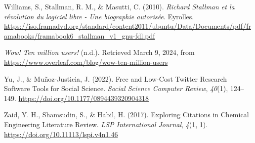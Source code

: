 \documentclass[
  letterpaper,
  DIV=11,
  numbers=noendperiod]{scrreprt}
\newlength{\cslhangindent}
\newlength{\cslentryspacingunit} %
\newenvironment{CSLReferences}[2] %
 {%
  \setlength{\parindent}{0pt}
  \ifodd #1
  \let\oldpar\par
  \def\par{\hangindent=\cslhangindent\oldpar}
  \fi
  \setlength{\parskip}{#2\cslentryspacingunit}
 }%
 {}
\begin{document}
\begin{CSLReferences}{1}{0}
\leavevmode{}%
Williams, S., Stallman, R. M., \& Masutti, C. (2010). \emph{Richard
Stallman et la révolution du logiciel libre - Une biographie autorisée}.
Eyrolles.
\url{https://iso.framadvd.org/standard/content2011/ubuntu/Data/Documents/pdf/framabooks/framabook6_stallman_v1_gnu-fdl.pdf}

\leavevmode{}%
\emph{Wow! {Ten} million users!} (n.d.). Retrieved March 9, 2024, from
\url{https://www.overleaf.com/blog/wow-ten-million-users}

\leavevmode{}%
Yu, J., \& Muñoz-Justicia, J. (2022). Free and {Low-Cost Twitter
Research Software Tools} for {Social Science}. \emph{Social Science
Computer Review}, \emph{40}(1), 124--149.
\url{https://doi.org/10.1177/0894439320904318}

\leavevmode{}%
Zaid, Y. H., Shamsudin, S., \& Habil, H. (2017). Exploring {Citations}
in {Chemical Engineering Literature Review}. \emph{LSP International
Journal}, \emph{4}(1, 1). \url{https://doi.org/10.11113/lspi.v4n1.46}

\end{CSLReferences}
\end{document}

